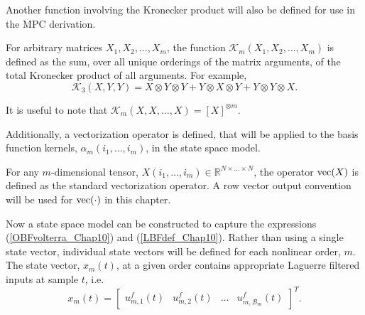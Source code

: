 Another function involving the Kronecker product will also be defined for use in the MPC derivation.

\begin{defn}
For arbitrary matrices $X_1,X_2,\hdots,X_m$, the function $\mathcal{K}_m(X_1,X_2,\hdots,X_m)$ is defined as the sum, over all unique orderings of the matrix arguments, of the total Kronecker product of all arguments. For example, $$\mathcal{K}_3(X,Y,Y) = X \otimes Y \otimes Y + Y \otimes X \otimes Y + Y \otimes Y \otimes X.$$
\label{def:Kronpermsum}
\end{defn}

\begin{rem}
It is useful to note that $\mathcal{K}_m(X,X,\hdots,X) = [X]^{\otimes m}$.
\end{rem}

Additionally, a vectorization operator is defined, that will be applied to the basis function kernels, $\alpha_m(i_1,\hdots,i_m)$, in the state space model.

\begin{notation}
For any $m$-dimensional tensor, $X(i_1,\hdots,i_m) \in \mathbb{R}^{N \times \hdots \times N}$, the operator $\operatorname{vec}(X)$ is defined as the standard vectorization operator. A row vector output convention will be used for $\operatorname{vec}(\cdot)$ in this chapter.
\end{notation}

Now a state space model can be constructed to capture the expressions (\ref{OBFvolterra_Chap10}) and (\ref{LBFdef_Chap10}). Rather than using a single state vector, individual state vectors will be defined for each nonlinear order, $m$. The state vector, $x_m(t)$, at a given order contains appropriate Laguerre filtered inputs at sample $t$, i.e.
\begin{equation}
x_m(t) = \begin{bmatrix} u^f_{m,1}(t) & u^f_{m,2}(t) & \hdots & u^f_{m,\mathcal{B}_m}(t) \end{bmatrix}^T.
\end{equation} 


